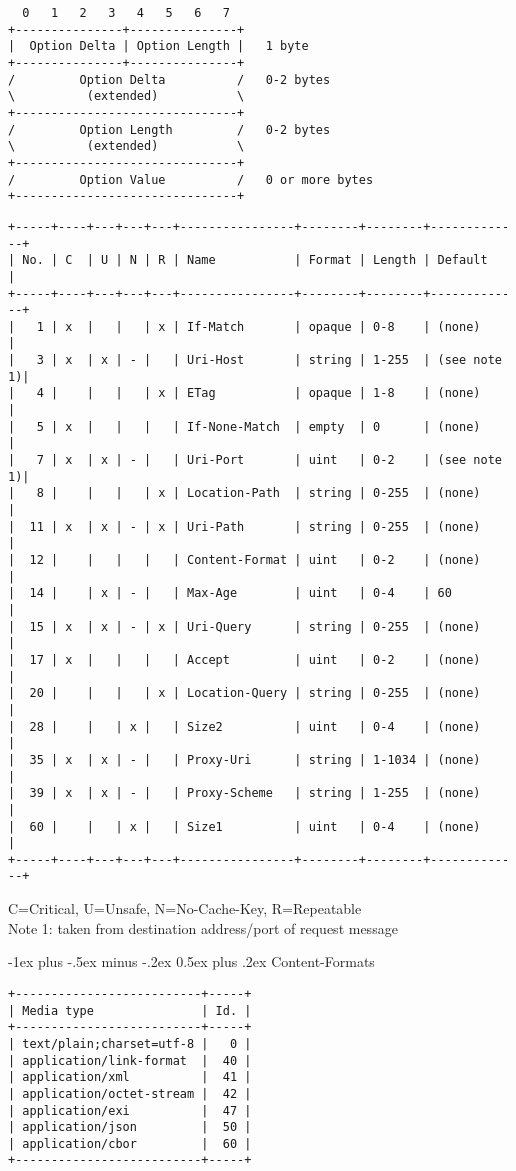 \documentclass[a4,10pt,landscape]{article}
\makeatletter
\renewcommand{\section}{\@startsection{section}{1}{0mm}%
                                {-1ex plus -.5ex minus -.2ex}%
                                {0.5ex plus .2ex}%
                                {\normalfont\large\bfseries}}
\makeatother
\begin{document}
\begin{multicols}{3}
{\tiny
\begin{verbatim}
  0   1   2   3   4   5   6   7
+---------------+---------------+
|  Option Delta | Option Length |   1 byte
+---------------+---------------+
/         Option Delta          /   0-2 bytes
\          (extended)           \
+-------------------------------+
/         Option Length         /   0-2 bytes
\          (extended)           \
+-------------------------------+
/         Option Value          /   0 or more bytes
+-------------------------------+
\end{verbatim}
}

{\tiny
\begin{verbatim}
+-----+----+---+---+---+----------------+--------+--------+-------------+
| No. | C  | U | N | R | Name           | Format | Length | Default     |
+-----+----+---+---+---+----------------+--------+--------+-------------+
|   1 | x  |   |   | x | If-Match       | opaque | 0-8    | (none)      |
|   3 | x  | x | - |   | Uri-Host       | string | 1-255  | (see note 1)|
|   4 |    |   |   | x | ETag           | opaque | 1-8    | (none)      |
|   5 | x  |   |   |   | If-None-Match  | empty  | 0      | (none)      |
|   7 | x  | x | - |   | Uri-Port       | uint   | 0-2    | (see note 1)|
|   8 |    |   |   | x | Location-Path  | string | 0-255  | (none)      |
|  11 | x  | x | - | x | Uri-Path       | string | 0-255  | (none)      |
|  12 |    |   |   |   | Content-Format | uint   | 0-2    | (none)      |
|  14 |    | x | - |   | Max-Age        | uint   | 0-4    | 60          |
|  15 | x  | x | - | x | Uri-Query      | string | 0-255  | (none)      |
|  17 | x  |   |   |   | Accept         | uint   | 0-2    | (none)      |
|  20 |    |   |   | x | Location-Query | string | 0-255  | (none)      |
|  28 |    |   | x |   | Size2          | uint   | 0-4    | (none)      |
|  35 | x  | x | - |   | Proxy-Uri      | string | 1-1034 | (none)      |
|  39 | x  | x | - |   | Proxy-Scheme   | string | 1-255  | (none)      |
|  60 |    |   | x |   | Size1          | uint   | 0-4    | (none)      |
+-----+----+---+---+---+----------------+--------+--------+-------------+
\end{verbatim}
C=Critical, U=Unsafe, N=No-Cache-Key, R=Repeatable \\
Note 1: taken from destination address/port of request message
}

\section{Content-Formats}
{\tiny
\begin{verbatim}
+--------------------------+-----+
| Media type               | Id. |
+--------------------------+-----+
| text/plain;charset=utf-8 |   0 |
| application/link-format  |  40 |
| application/xml          |  41 |
| application/octet-stream |  42 |
| application/exi          |  47 |
| application/json         |  50 |
| application/cbor         |  60 |
+--------------------------+-----+
\end{verbatim}
}


\end{multicols}
\end{document}
